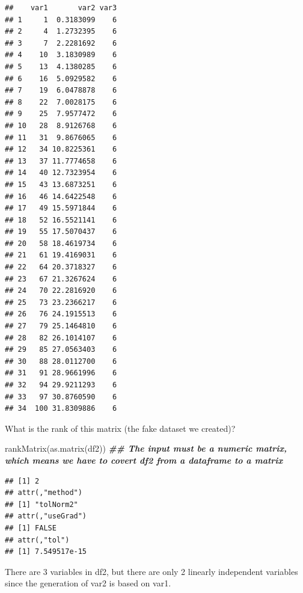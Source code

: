 \documentclass[
]{article}
\newenvironment{Shaded}{\begin{snugshade}}{\end{snugshade}}
\newcommand{\DocumentationTok}[1]{\textcolor[rgb]{0.56,0.35,0.01}{\textbf{\textit{#1}}}}
\newcommand{\FunctionTok}[1]{\textcolor[rgb]{0.00,0.00,0.00}{#1}}
\newcommand{\NormalTok}[1]{#1}
\begin{document}
\begin{verbatim}
##    var1       var2 var3
## 1     1  0.3183099    6
## 2     4  1.2732395    6
## 3     7  2.2281692    6
## 4    10  3.1830989    6
## 5    13  4.1380285    6
## 6    16  5.0929582    6
## 7    19  6.0478878    6
## 8    22  7.0028175    6
## 9    25  7.9577472    6
## 10   28  8.9126768    6
## 11   31  9.8676065    6
## 12   34 10.8225361    6
## 13   37 11.7774658    6
## 14   40 12.7323954    6
## 15   43 13.6873251    6
## 16   46 14.6422548    6
## 17   49 15.5971844    6
## 18   52 16.5521141    6
## 19   55 17.5070437    6
## 20   58 18.4619734    6
## 21   61 19.4169031    6
## 22   64 20.3718327    6
## 23   67 21.3267624    6
## 24   70 22.2816920    6
## 25   73 23.2366217    6
## 26   76 24.1915513    6
## 27   79 25.1464810    6
## 28   82 26.1014107    6
## 29   85 27.0563403    6
## 30   88 28.0112700    6
## 31   91 28.9661996    6
## 32   94 29.9211293    6
## 33   97 30.8760590    6
## 34  100 31.8309886    6
\end{verbatim}

What is the rank of this matrix (the fake dataset we created)?

\begin{Shaded}
\begin{Highlighting}[]
\FunctionTok{rankMatrix}\NormalTok{(}\FunctionTok{as.matrix}\NormalTok{(df2)) }\DocumentationTok{\#\# The input must be a numeric matrix, which means we have to covert df2 from a dataframe to a matrix}
\end{Highlighting}
\end{Shaded}

\begin{verbatim}
## [1] 2
## attr(,"method")
## [1] "tolNorm2"
## attr(,"useGrad")
## [1] FALSE
## attr(,"tol")
## [1] 7.549517e-15
\end{verbatim}

There are 3 variables in df2, but there are only 2 linearly independent
variables since the generation of var2 is based on var1.
\end{document}
